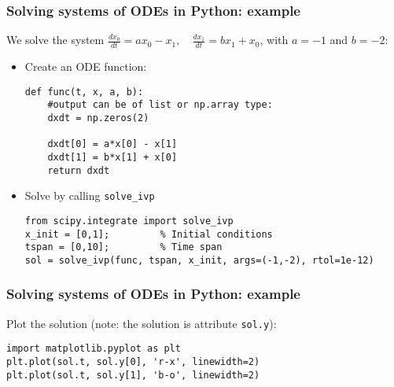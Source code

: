 \begin{frame}[fragile]
  \frametitle{Solving systems of ODEs in Python: example}
  We solve the system $\displaystyle \frac{dx_0}{dt} = ax_0 - x_1, \quad  \frac{dx_1}{dt} = bx_1 + x_0$, with $a=-1$ and $b=-2$:
  \begin{itemize}
    \item Create an ODE function:
    \begin{lstlisting}
def func(t, x, a, b):
    #output can be of list or np.array type:
    dxdt = np.zeros(2)

    dxdt[0] = a*x[0] - x[1]
    dxdt[1] = b*x[1] + x[0]
    return dxdt
    \end{lstlisting}
  \item Solve by calling \lstinline$solve_ivp$
    \begin{lstlisting}
from scipy.integrate import solve_ivp
x_init = [0,1];         % Initial conditions
tspan = [0,10];         % Time span
sol = solve_ivp(func, tspan, x_init, args=(-1,-2), rtol=1e-12)
    \end{lstlisting}
  \end{itemize}
\vfill
\end{frame}

{\nologo
\begin{frame}[fragile]
  \frametitle{Solving systems of ODEs in Python: example}
  Plot the solution (note: the solution is attribute \lstinline|sol.y|):
  \begin{lstlisting}
import matplotlib.pyplot as plt
plt.plot(sol.t, sol.y[0], 'r-x', linewidth=2)
plt.plot(sol.t, sol.y[1], 'b-o', linewidth=2)
  \end{lstlisting}
  \pause
  \begin{center}
  \end{center}
\end{frame}
}

